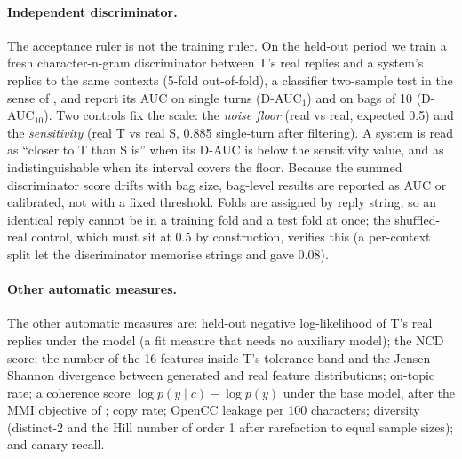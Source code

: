 \paragraph{Independent discriminator.}
The acceptance ruler is not the training ruler.
On the held-out period we train a fresh character-n-gram discriminator between T's real replies and a system's replies to the same contexts (5-fold out-of-fold), a classifier two-sample test in the sense of \citet{lopezpaz2017revisiting}, and report its AUC on single turns (D-AUC$_1$) and on bags of 10 (D-AUC$_{10}$).
Two controls fix the scale: the \emph{noise floor} (real vs real, expected 0.5) and the \emph{sensitivity} (real T vs real S, 0.885 single-turn after filtering).
A system is read as ``closer to T than S is'' when its D-AUC is below the sensitivity value, and as indistinguishable when its interval covers the floor.
Because the summed discriminator score drifts with bag size, bag-level results are reported as AUC or calibrated, not with a fixed threshold.
Folds are assigned by reply string, so an identical reply cannot be in a training fold and a test fold at once; the shuffled-real control, which must sit at 0.5 by construction, verifies this (a per-context split let the discriminator memorise strings and gave 0.08).

\paragraph{Other automatic measures.}
The other automatic measures are: held-out negative log-likelihood of T's real replies under the model (a fit measure that needs no auxiliary model); the NCD score; the number of the 16 features inside T's tolerance band and the Jensen--Shannon divergence \citep{lin1991divergence} between generated and real feature distributions; on-topic rate; a coherence score $\log p(y \mid c) - \log p(y)$ under the base model, after the MMI objective of \citet{li2016diversity}; copy rate; OpenCC leakage per 100 characters; diversity (distinct-2 \citep{li2016diversity} and the Hill number of order 1 \citep{hill1973diversity} after rarefaction to equal sample sizes); and canary recall.

